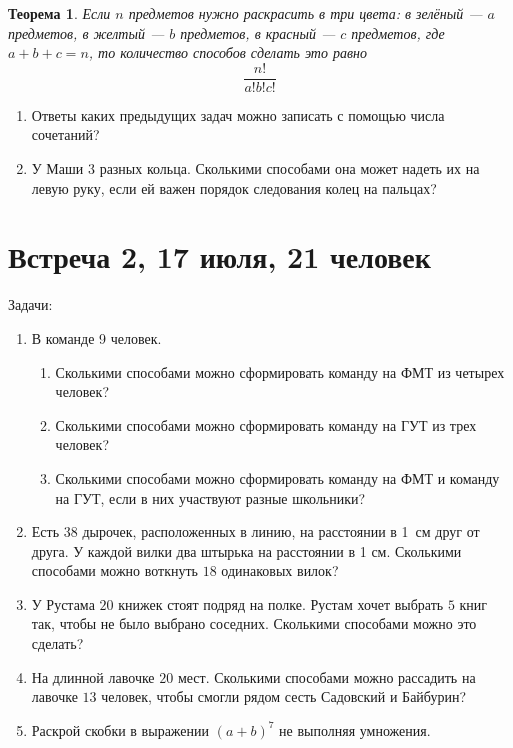 \documentclass[pdftex,12pt,a4paper]{article}
\newtheorem*{theorem}{Теорема}
\begin{document}
\begin{theorem}
Если $n$ предметов нужно раскрасить в три цвета: в зелёный --- $a$ предметов, в желтый --- $b$ предметов, в красный --- $c$ предметов, где $a+b+c=n$, то количество способов сделать это равно
\[
\frac{n!}{a!b!c!}
\]
\end{theorem}


\begin{enumerate}[resume]
\item Ответы каких предыдущих задач можно записать с помощью числа сочетаний?
\item У Маши 3 разных кольца. Сколькими способами она может надеть их на левую руку, если ей важен порядок следования колец на пальцах?
\end{enumerate}


\newpage
\section{Встреча 2, 17 июля, 21 человек}

Задачи:
\begin{enumerate}
\item В команде 9 человек. 
\begin{enumerate}
\item Сколькими способами можно сформировать команду на ФМТ из четырех человек?
\item Сколькими способами можно сформировать команду на ГУТ из трех человек?
\item Сколькими способами можно сформировать команду на ФМТ и команду на ГУТ, если в них участвуют разные школьники?
\end{enumerate}
\item Есть $38$ дырочек, расположенных в линию, на расстоянии в 1~см друг от друга. У каждой вилки два штырька на расстоянии в 1 см.
 Сколькими способами можно воткнуть $18$ одинаковых вилок?
\item У Рустама $20$ книжек стоят подряд на полке. Рустам хочет выбрать $5$ книг так, чтобы не было выбрано соседних. Сколькими способами можно это сделать?

\item На длинной лавочке $20$ мест. Сколькими способами можно рассадить на лавочке $13$ человек, чтобы смогли рядом сесть Садовский и Байбурин?

\item Раскрой скобки в выражении $(a+b)^7$ не выполняя умножения.
   
\end{enumerate}
\end{document}

